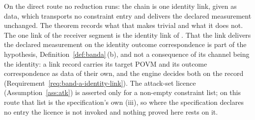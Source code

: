 
On the direct route no reduction runs: the chain is one identity link, given
as data, which transports no constraint entry and delivers the declared
measurement unchanged. The theorem records what that makes trivial and what
it does not. The one link of the receiver segment is the identity link of
. That the link delivers the declared
measurement on the identity outcome correspondence is part of the hypothesis,
Definition~\ref{def:banda}\,(b), and not a consequence of its channel being
the identity: a link record carries its target POVM and its outcome
correspondence as data of their own, and the engine decides both on the
record (Requirement~\ref{req:band-a-identity-link}). The attack-set licence
(Assumption~\ref{ass:atk}) is asserted only for a non-empty constraint list;
on this route that list is the specification's own (iii), so where the
specification declares no entry the licence is not invoked and nothing proved
here rests on it.

